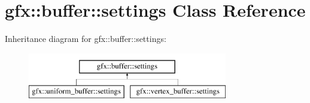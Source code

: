 \hypertarget{classgfx_1_1buffer_1_1settings}{\section{gfx\-:\-:buffer\-:\-:settings Class Reference}
\label{classgfx_1_1buffer_1_1settings}
}
Inheritance diagram for gfx\-:\-:buffer\-:\-:settings\-:\begin{figure}[H]
\begin{center}
\leavevmode
\includegraphics[height=2.000000cm]{classgfx_1_1buffer_1_1settings}
\end{center}
\end{figure}
